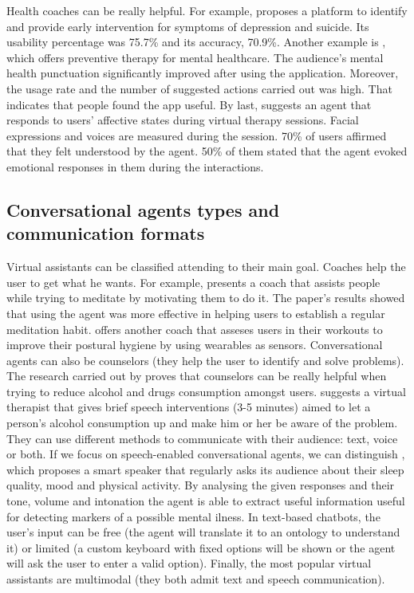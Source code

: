 \documentclass[12pt,english]{article}
\begin{document}
Health coaches can be really helpful. For example, \cite{Breso2016297} proposes a platform to identify and provide early intervention for symptoms of depression and suicide. Its usability percentage was 75.7\% and its accuracy, 70.9\%. Another example is \cite{Hirano2017}, which offers preventive therapy for mental healthcare. The audience's mental health punctuation significantly improved after using the application. Moreover, the usage rate and the number of suggested actions carried out was high. That indicates that people found the app useful. By last, \cite{Ring2016} suggests an agent that responds to users' affective states during virtual therapy sessions. Facial expressions and voices are measured during the session. 70\% of users affirmed that they felt understood by the agent. 50\% of them stated that the agent evoked emotional responses in them during the interactions.

\newpage
\subsection{Conversational agents types and communication formats}

Virtual assistants can be classified attending to their main goal. Coaches help the user to get what he wants. For example, \cite{HUDLICKA2013160} presents a coach that assists people while trying to meditate by motivating them to do it. The paper's results showed that using the agent was more effective in helping users to establish a regular meditation habit. \cite{Guo2020} offers another coach that asseses users in their workouts to improve their postural hygiene by using wearables as sensors. Conversational agents can also be counselors (they help the user to identify and solve problems). The research carried out by \cite{Drislane2020158} proves that counselors can be really helpful when trying to reduce alcohol and drugs consumption amongst users. \cite{Yasavur2014381} suggests a virtual therapist that gives brief speech interventions (3-5 minutes) aimed to let a person's alcohol consumption up and make him or her be aware of the problem. \\

They can use different methods to communicate with their audience: text, voice or both. If we focus on speech-enabled conversational agents, we can distinguish \cite{Maharjan2019929}, which proposes a smart speaker that regularly asks its audience about their sleep quality, mood and physical activity. By analysing the given responses and their tone, volume and  intonation the agent is able to extract useful information useful for detecting markers of a possible mental ilness. In text-based chatbots, the user's input can be free (the agent will translate it to an ontology to understand it) or limited (a custom keyboard with fixed options will be shown or the agent will ask the user to enter a valid option). Finally, the most popular virtual assistants are multimodal (they both admit text and speech communication).
\end{document}
